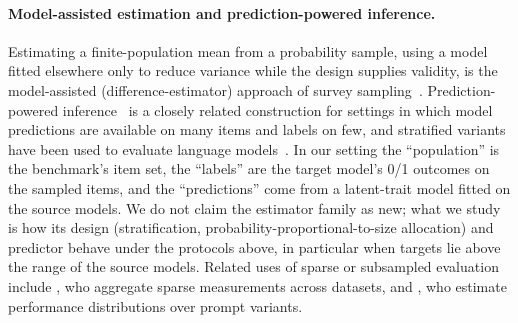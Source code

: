 \paragraph{Model-assisted estimation and prediction-powered inference.}
Estimating a finite-population mean from a probability sample, using a model fitted elsewhere only to reduce variance while the design supplies validity, is the model-assisted (difference-estimator) approach of survey sampling~\citep{sarndal1992model,breidt2017model}.
Prediction-powered inference~\citep{angelopoulos2023ppi} is a closely related construction for settings in which model predictions are available on many items and labels on few, and stratified variants have been used to evaluate language models~\citep{fisch2024stratified}.
In our setting the ``population'' is the benchmark's item set, the ``labels'' are the target model's 0/1 outcomes on the sampled items, and the ``predictions'' come from a latent-trait model fitted on the source models.
We do not claim the estimator family as new; what we study is how its design (stratification, probability-proportional-to-size allocation) and predictor behave under the protocols above, in particular when targets lie above the range of the source models.
Related uses of sparse or subsampled evaluation include \citet{ghosh2024onebench}, who aggregate sparse measurements across datasets, and \citet{polo2024prompteval}, who estimate performance distributions over prompt variants.
